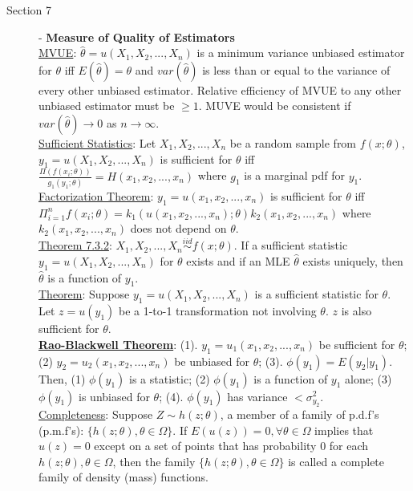 \documentclass[10pt,landscape]{article}
\begin{document}
\begin{multicols}{3}
	\begin{description}
		\item[Section 7] - \textbf{Measure of Quality of Estimators}\\
		\underline{MVUE}: $\hat{\theta} = u(X_1, X_2, ..., X_n)$ is a minimum variance unbiased estimator for $\theta$ iff $E(\hat{\theta}) = \theta$ and $var(\hat{\theta})$ is less than or equal to the variance of every other unbiased estimator. Relative efficiency of MVUE to any other unbiased estimator must be $\geq 1$. MUVE would be consistent if $var(\hat{\theta}) \rightarrow 0$ as $n\rightarrow\infty$. \\
		\underline{Sufficient Statistics}: Let $X_1, X_2, ..., X_n$ be a random sample from $f(x;\theta)$, $y_1 = u(X_1,X_2, ..., X_n)$ is sufficient for $\theta$ iff $\frac{\Pi(f(x_i;\theta))}{g_1(y_1;\theta)} = H(x_1, x_2, ..., x_n)$ where $g_1$ is a marginal pdf for $y_1$.\\
		\underline{Factorization Theorem}: $y_1 = u(x_1, x_2,..., x_n)$ is sufficient for $\theta$ iff $\Pi_{i=1}^n f(x_i; \theta) = k_1(u(x_1, x_2, ..., x_n); \theta) k_2(x_1, x_2, ..., x_n)$ where $k_2(x_1, x_2, ..., x_n)$ does not depend on $\theta$. \\
		\underline{Theorem 7.3.2}: $X_1, X_2, ..., X_n \overset{iid}{\sim} f(x; \theta)$. If a sufficient statistic $y_1 = u(X_1,X_2, ..., X_n)$ for $\theta$ exists and if an MLE $\hat{\theta}$ exists uniquely, then $\hat{\theta}$ is a function of $y_1$. \\
		\underline{Theorem}: Suppose $y_1 = u(X_1,X_2, ..., X_n)$ is a sufficient statistic for $\theta$. Let $z = u(y_1)$ be a 1-to-1 transformation not involving $\theta$. $z$ is also sufficient for $\theta$. \\
		\underline{\textbf{Rao-Blackwell Theorem}}: (1). $y_1 = u_1(x_1, x_2, ..., x_n)$ be sufficient for $\theta$; (2) $y_2 = u_2(x_1, x_2, ..., x_n)$ be unbiased for $\theta$; (3). $\phi(y_1) = E(y_2|y_1)$. Then, (1) $\phi(y_1)$ is a statistic; (2) $\phi(y_1)$ is a function of $y_1$ alone; (3) $\phi(y_1)$ is unbiased for $\theta$; (4). $\phi(y_1)$  has variance $< \sigma_{y_2}^2$. \\
		\underline{Completeness}:  Suppose $Z \sim h(z; \theta)$, a member of a family of p.d.f's (p.m.f's): $\{h(z;\theta), \theta	\in \Omega \}$. If $E(u(z)) = 0, \forall \theta \in \Omega$ implies that $u(z) = 0$ except on a set of points that has probability 0 for each $h(z; \theta), \theta	\in \Omega$, then the family $\{h(z;\theta), \theta	\in \Omega \}$ is called a complete family of density (mass) functions. \\

\end{description}
\end{multicols}
\end{document}
